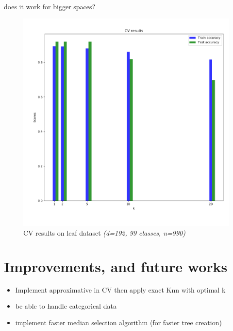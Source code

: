 \documentclass[11 pt]{beamer}
\begin{document}
\begin{frame}{does it work for bigger spaces?}
\begin{figure}
  \includegraphics[width=.55\textwidth]{figures/leafCv.png}
  \caption{CV results on leaf dataset \emph{(d=192, 99 classes, n=990)}}
\end{figure}
\end{frame}

\section{Improvements, and future works}

\begin{frame}
\begin{itemize}
  \item Implement approximative in CV then apply exact Knn with optimal k
  \item be able to handle categorical data
  \item implement faster median selection algorithm (for faster tree creation)
\end{itemize}
\end{frame}
\end{document}
